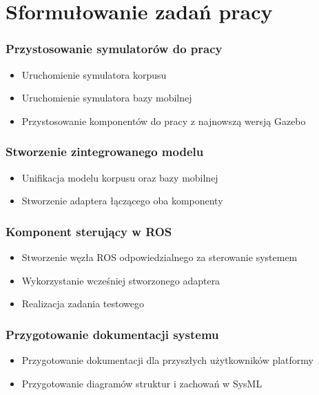 \section{Sformułowanie zadań pracy}


\begin{frame}
	\frametitle{Przystosowanie symulatorów do pracy}
	\begin{itemize}
		\item Uruchomienie symulatora korpusu
		\item Uruchomienie symulatora bazy mobilnej
		\item Przystosowanie komponentów do pracy z najnowszą wersją Gazebo 
	\end{itemize}
\end{frame}


\begin{frame}
	\frametitle{Stworzenie zintegrowanego modelu}
	\begin{itemize}
		\item Unifikacja modelu korpusu oraz bazy mobilnej
		\item Stworzenie adaptera łączącego oba komponenty 
	\end{itemize}
\end{frame}


\begin{frame}
	\frametitle{Komponent sterujący w ROS}
	\begin{itemize}
		\item Stworzenie węzła ROS odpowiedzialnego za sterowanie systemem
		\item Wykorzystanie wcześniej stworzonego adaptera
		\item Realizacja zadania testowego
	\end{itemize}
\end{frame}


\begin{frame}
	\frametitle{Przygotowanie dokumentacji systemu}
	\begin{itemize}
		\item Przygotowanie dokumentacji dla przyszłych użytkowników platformy
		\item Przygotowanie diagramów struktur i zachowań w SysML
	\end{itemize}
\end{frame}


